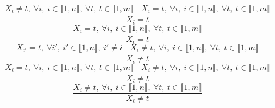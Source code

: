 $$\frac{X_{i} \neq t,~\forall i,~i \in \llbracket1,n\rrbracket,~\forall t,~t \in \llbracket1,m\rrbracket~~~~X_{i}=t,~\forall i,~i \in \llbracket1,n\rrbracket,~\forall t,~t \in \llbracket1,m\rrbracket}{X_{i}=t}$$ $$\frac{X_{i}=t,~\forall i,~i \in \llbracket1,n\rrbracket,~\forall t,~t \in \llbracket1,m\rrbracket}{X_{i}=t}$$ $$\frac{X_{i'}=t,~\forall i',~i' \in \llbracket1,n\rrbracket,~i' \neq i~~~~X_{i} \neq t,~\forall i,~i \in \llbracket1,n\rrbracket,~\forall t,~t \in \llbracket1,m\rrbracket}{X_{i} \neq t}$$ $$\frac{X_{i}=t,~\forall i,~i \in \llbracket1,n\rrbracket,~\forall t,~t \in \llbracket1,m\rrbracket~~~~X_{i} \neq t,~\forall i,~i \in \llbracket1,n\rrbracket,~\forall t,~t \in \llbracket1,m\rrbracket}{X_{i} \neq t}$$ $$\frac{X_{i} \neq t,~\forall i,~i \in \llbracket1,n\rrbracket,~\forall t,~t \in \llbracket1,m\rrbracket}{X_{i} \neq t}$$ 